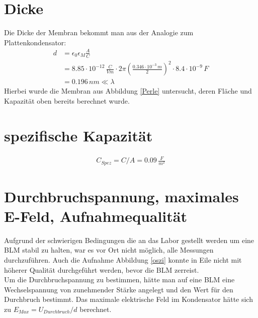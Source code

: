 \documentclass{include/thesisclass3}
\newcommand{\e}[1]{\,\si{#1}}
\begin{document}
\section{Dicke}
Die Dicke der Membran bekommt man aus der Analogie zum Plattenkondensator:
\begin{align*}
	d&=\epsilon_0\epsilon_M \frac{A}{C}\\
	&=8.85\cdot 10^{-12}\e{\frac{C}{Vm}}\cdot 2 \pi \left(\frac{0.346\cdot 10^{-3}\e{m}}{2}\right)^2\cdot 8.4\cdot 10^{-9}\e{F}\\
	&=0.196\e{nm} \ll \lambda
\end{align*}
Hierbei wurde die Membran aus Abbildung \ref{Perle} untersucht, deren Fläche und Kapazität oben bereits berechnet wurde. 

\section{spezifische Kapazität}
\begin{align*}
C_{Spez}=C/A=0.09\e{\frac{F}{m^2}}
\end{align*}
\section{Durchbruchspannung, maximales E-Feld, Aufnahmequalität}
Aufgrund der schwierigen Bedingungen die an das Labor gestellt werden um eine BLM stabil zu halten, war es vor Ort nicht möglich, alle Messungen durchzuführen. Auch die Aufnahme Abbildung \ref{oszi} konnte in Eile nicht mit höherer Qualität durchgeführt werden, bevor die BLM zerreist.\\
Um die Durchbruchspannung zu bestimmen, hätte man auf eine BLM eine Wechselspannung von zunehmender Stärke angelegt und den Wert für den Durchbruch bestimmt. Das maximale elektrische Feld im Kondensator hätte sich zu $E_{Max}=U_{Durchbruch}/d$ berechnet.
\end{document}
